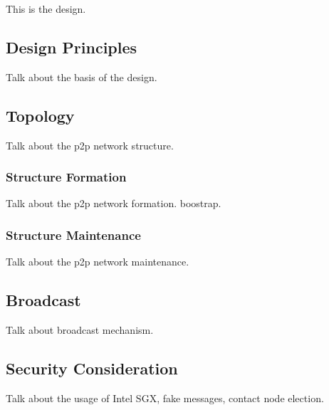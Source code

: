 This is the design. \\

\subsection{Design Principles}

Talk about the basis of the design.

\subsection{Topology}

Talk about the p2p network structure.

\subsubsection{Structure Formation}

Talk about the p2p network formation. boostrap.

\subsubsection{Structure Maintenance}

Talk about the p2p network maintenance.

\subsection{Broadcast}

Talk about broadcast mechanism.

\subsection{Security Consideration}

Talk about the usage of Intel SGX, fake messages, contact node election.